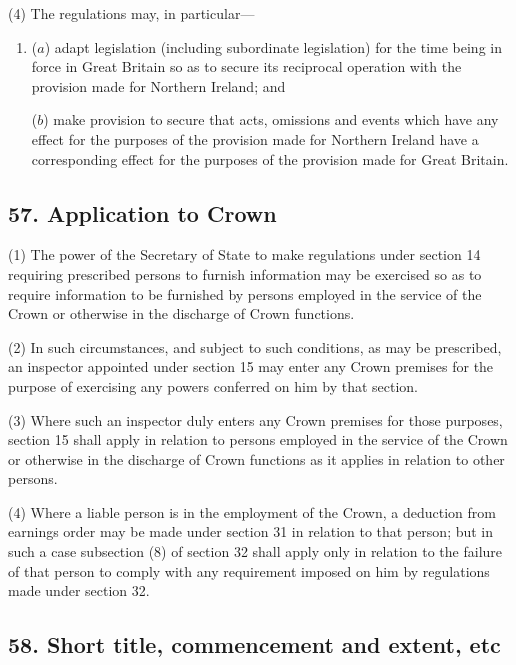 \documentclass[12pt,a4paper]{article}
\begin{document}
(4) The regulations may, in particular—
\begin{enumerate}\item[]
($a$) adapt legislation (including subordinate legislation) for the time being in force in Great Britain so as to secure its reciprocal operation with the provision made for Northern Ireland; and

($b$) make provision to secure that acts, omissions and events which have any effect for the purposes of the provision made for Northern Ireland have a corresponding effect for the purposes of the provision made for Great Britain.
\end{enumerate}


\subsection{57. Application to Crown}

(1) The power of the Secretary of State to make regulations under section 14 requiring prescribed persons to furnish information may be exercised so as to require information to be furnished by persons employed in the service of the Crown or otherwise in the discharge of Crown functions.

(2) In such circumstances, and subject to such conditions, as may be prescribed, an inspector appointed under section 15 may enter any Crown premises for the purpose of exercising any powers conferred on him by that section.

(3) Where such an inspector duly enters any Crown premises for those purposes, section 15 shall apply in relation to persons employed in the service of the Crown or otherwise in the discharge of Crown functions as it applies in relation to other persons.

(4) Where a liable person is in the employment of the Crown, a deduction from earnings order may be made under section 31 in relation to that person; but in such a case subsection (8)  of section 32 shall apply only in relation to the failure of that person to comply with any requirement imposed on him by regulations made under section 32.


\subsection{58. Short title, commencement and extent, etc}
\end{document}
